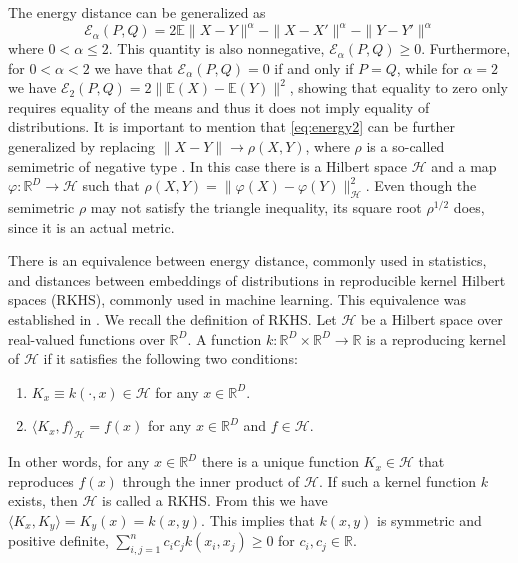 \documentclass[aps,preprint,nofootinbib,floatfix]{revtex4-1}
\def\Energy{\mathcal{E}}
\def\E{\mathbb{E}}
\begin{document}
The energy distance can be generalized as 
\begin{equation}\label{eq:energy2}
\Energy_\alpha(P, Q) = 2 \E \| X - Y\|^{\alpha} - \| X - X' \|^{\alpha} - 
\| Y - Y' \|^{\alpha}
\end{equation}
where $0<\alpha\le 2$. This quantity is also nonnegative,
$\Energy_\alpha(P,Q) \ge 0$. Furthermore, for $0<\alpha<2$ we have that
$\Energy_\alpha(P,Q) = 0$ if and only if $P=Q$, while for $\alpha=2$ 
we have $\Energy_2(P,Q) = 2\| \E(X) - \E(Y) \|^2$, showing that
equality to zero only requires
equality of the means and thus it does not imply equality of distributions.
It is important to 
mention that \eqref{eq:energy2} can be further generalized by
replacing
$\| X - Y\| \to \rho(X,Y)$, where $\rho$ is a so-called semimetric
of negative type \cite{Sejdinovic2013}. 
In this case there is a Hilbert space $\mathcal{H}$ and
a map $\varphi: \mathbb{R}^D \to
\mathcal{H}$ such that
$\rho(X, Y) = \| \varphi(X) - \varphi(Y) \|_{\mathcal{H}}^2$. 
Even though the semimetric 
$\rho$ may not satisfy the triangle inequality, its square
root $\rho^{1/2}$ does, since it is an actual metric.

There is an equivalence 
between energy distance, commonly used in statistics,
and distances between embeddings of distributions in reproducible
kernel Hilbert spaces (RKHS),
commonly used in machine learning. This equivalence was established
in \cite{Sejdinovic2013}. We recall the definition of
RKHS. Let $\mathcal{H}$ be a Hilbert space over real-valued functions
over $\mathbb{R}^D$. A function $k : \mathbb{R}^D \times \mathbb{R}^D \to 
\mathbb{R}$ is a reproducing kernel of $\mathcal{H}$ if it satisfies
the following two conditions:
\begin{enumerate}
\item $K_x \equiv k(\cdot, x) \in \mathcal{H}$ for any $x \in \mathbb{R}^D$.
\item $\langle K_x, f \rangle_{\mathcal{H}} = f(x)$ for
any $x\in\mathbb{R}^D$ and $f\in \mathcal{H}$.
\end{enumerate}
In other words, for any $x \in \mathbb{R}^D$ there is a unique function
$K_x \in \mathcal{H}$ that reproduces $f(x)$ through the inner product
of $\mathcal{H}$.
If such a kernel function $k$ exists, then $\mathcal{H}$ is called a RKHS.
From this we have $\langle K_x, K_y \rangle = K_y(x) = k(x,y)$. This implies
that $k(x,y)$ is symmetric and positive definite, $\sum_{i,j=1}^n c_i c_j
k(x_i,x_j) \ge 0$ for $c_i,c_j \in \mathbb{R}$.
\end{document}
